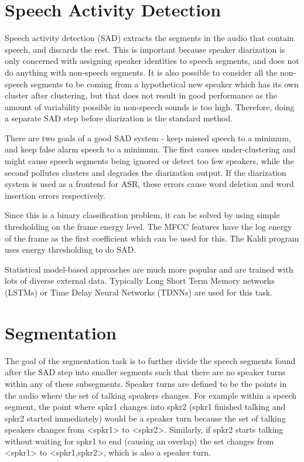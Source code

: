 \section{Speech Activity Detection}
Speech activity detection (SAD) extracts the segments in the audio that contain speech, and discards the rest. This is important because speaker diarization is only concerned with assigning speaker identities to speech segments, and does not do anything with non-speech segments. It is also possible to consider all the non-speech segments to be coming from a hypothetical new speaker which has its own cluster after clustering, but that does not result in good performance as the amount of variability possible in non-speech sounds is too high. Therefore, doing a separate SAD step before diarization is the standard method.

There are two goals of a good SAD system - keep missed speech to a minimum, and keep false alarm speech to a minimum. The first causes under-clustering and might cause speech segments being ignored or detect too few speakers, while the second pollutes clusters and degrades the diarization output. If the diarization system is used as a frontend for ASR, these errors cause word deletion and word insertion errors respectively.

Since this is a binary classification problem, it can be solved by using simple thresholding on the frame energy level. The MFCC features have the log energy of the frame as the first coefficient which can be used for this. The Kaldi program  uses energy thresholding to do SAD.

Statistical model-based approaches are much more popular and are trained with lots of diverse external data. Typically Long Short Term Memory networks (LSTMs) or Time Delay Neural Networks (TDNNs) are used for this task.

\section{Segmentation}

The goal of the segmentation task is to further divide the speech segments found after the SAD step into smaller segments such that there are no speaker turns within any of these subsegments. Speaker turns are defined to be the points in the audio where the set of talking speakers changes. For example within a speech segment, the point where spkr1 changes into spkr2 (spkr1 finished talking and spkr2 started immediately) would be a speaker turn because the set of talking speakers changes from <spkr1> to <spkr2>. Similarly, if spkr2 starts talking without waiting for spkr1 to end (causing an overlap) the set changes from <spkr1> to <spkr1,spkr2>, which is also a speaker turn.

